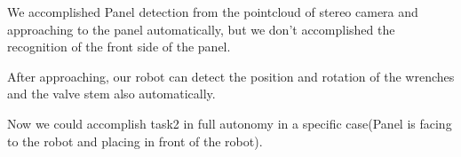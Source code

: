 We accomplished Panel detection from the pointcloud of stereo camera and approaching to the panel automatically, but we don't accomplished the recognition of the front side of the panel.

After approaching, our robot can detect the position and rotation of the wrenches and the valve stem also automatically.

Now we could accomplish task2 in full autonomy in a specific case(Panel is facing to the robot and placing in front of the robot).
